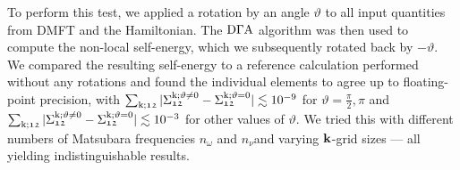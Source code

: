 \documentclass[../../main.tex]{subfiles}
\begin{document}
To perform this test, we applied a rotation by an angle $\vartheta$ to all input quantities from DMFT and the Hamiltonian. The $\text{D}\Gamma\text{A}$ algorithm was then used to compute the non-local self-energy, which we subsequently rotated back by $-\vartheta$. We compared the resulting self-energy to a reference calculation performed without any rotations and found the individual elements to agree up to floating-point precision, with $\sum_{\text{k};\mathfrak{12}}|\Sigma_{\mathfrak{12}}^{\text{k};\vartheta\neq0}-\Sigma_{\mathfrak{12}}^{\text{k};\vartheta=0}|\lesssim 10^{-9}$ for $\vartheta=\frac\pi2,\pi$ and $\sum_{\text{k};\mathfrak{12}}|\Sigma_{\mathfrak{12}}^{\text{k};\vartheta\neq0}-\Sigma_{\mathfrak{12}}^{\text{k};\vartheta=0}|\lesssim 10^{-3}$ for other values of $\vartheta$. We tried this with different numbers of Matsubara frequencies $n_\omega$ and $n_\nu$​ and varying $\textbf{k}$-grid sizes --- all yielding indistinguishable results. 
\end{document}
